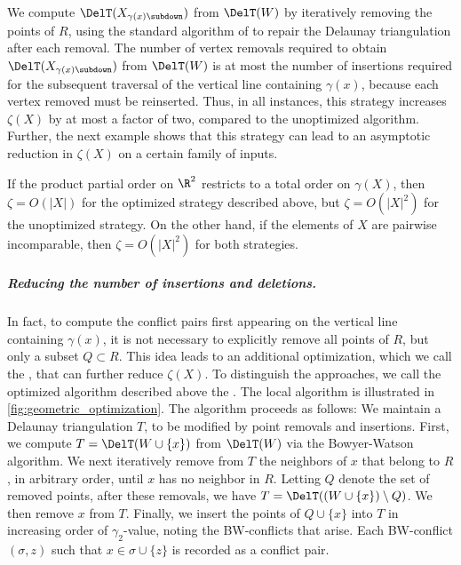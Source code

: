 We compute $\DelT(X_{\gamma(x){\subdown}})$ from $\DelT(W)$ by iteratively removing the points of $R$, using the standard algorithm of \cite{Devillers1999} to repair the Delaunay triangulation after each removal.  
%
The number of vertex removals required to obtain $\DelT(X_{\gamma(x){\subdown}})$ from $\DelT(W)$ is at most the number of insertions required for the subsequent traversal of the vertical line containing $\gamma(x)$, because each vertex removed must be reinserted.  Thus, in all instances, this strategy increases $\zeta(X)$ by at most a factor of two, compared to the unoptimized algorithm.  Further, the next example shows that this strategy can lead to an asymptotic reduction in $\zeta(X)$ on a certain family of inputs.   
%
\begin{example}
If the product partial order on $\R^2$ restricts to a total order on $\gamma(X)$, then $\zeta=O(|X|)$ for the optimized strategy described above, but $\zeta=O(|X|^2)$ for the unoptimized strategy.  On the other hand, if the elements of $X$ are pairwise incomparable, then $\zeta=O(|X|^2)$ for both strategies.  
\end{example}
%
%
\subparagraph{Reducing the number of insertions and deletions.} 
In fact, to compute the conflict pairs first appearing on the vertical line containing $\gamma(x)$, it is not necessary to explicitly remove all points of $R$, but only a subset $Q\subset R$.  This idea leads to an additional optimization, which we call the , that can further reduce $\zeta(X)$.  To distinguish the approaches, we call the optimized algorithm described above the .
%
The local algorithm is illustrated in \cref{fig:geometric_optimization}.  The algorithm proceeds as follows:  We maintain a Delaunay triangulation $T$, to be modified by point removals and insertions.  First, we compute $T=\DelT(W\cup \{x\})$ from $\DelT(W)$ via the Bowyer-Watson algorithm.  We next iteratively remove from $T$ the neighbors of $x$ that belong to $R$, in arbitrary order, until $x$ has no neighbor in $R$.  Letting $Q$ denote the set of removed points, after these removals, we have $T=\DelT((W\cup\{x\})\setminus Q)$.  We then remove $x$ from $T$.  Finally, we insert the points of $Q\cup \{x\}$ into $T$ in increasing order of $\gamma_2$-value, noting the BW-conflicts that arise.  Each BW-conflict $(\sigma, z)$ such that $x\in \sigma\cup\{z\}$ is recorded as a conflict pair.  
